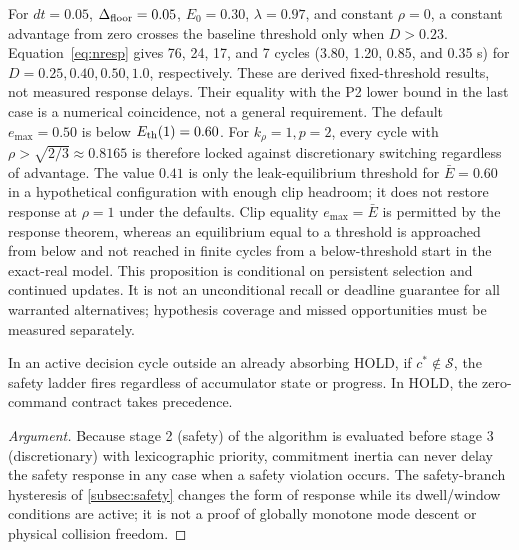 \begin{remark} \label{rem:resptime}
For $dt=0.05$, $\Delta_{\text{floor}}=0.05$, $E_0=0.30$, $\lambda=0.97$, and constant $\rho=0$, a constant advantage from zero crosses the baseline threshold only when $D>0.23$. Equation~\eqref{eq:nresp} gives 76, 24, 17, and 7 cycles (3.80, 1.20, 0.85, and 0.35 s) for $D=0.25,0.40,0.50,1.0$, respectively. These are derived fixed-threshold results, not measured response delays. Their equality with the P2 lower bound in the last case is a numerical coincidence, not a general requirement.
The default $e_{\max}=0.50$ is below $E_{\text{th}}(1)=0.60$. For $k_\rho=1,p=2$, every cycle with $\rho>\sqrt{2/3}\approx0.8165$ is therefore locked against discretionary switching regardless of advantage. The value $0.41$ is only the leak-equilibrium threshold for $\bar E=0.60$ in a hypothetical configuration with enough clip headroom; it does not restore response at $\rho=1$ under the defaults. Clip equality $e_{\max}=\bar E$ is permitted by the response theorem, whereas an equilibrium equal to a threshold is approached from below and not reached in finite cycles from a below-threshold start in the exact-real model.
This proposition is conditional on persistent selection and continued updates. It is not an unconditional recall or deadline guarantee for all warranted alternatives; hypothesis coverage and missed opportunities must be measured separately.
\end{remark}

\begin{proposition} \label{prop:p3}
In an active decision cycle outside an already absorbing HOLD, if $c^*\notin\mathcal{S}$, the safety ladder fires regardless of accumulator state or progress. In HOLD, the zero-command contract takes precedence.
\end{proposition}

\begin{proof}[Argument]
Because stage 2 (safety) of the algorithm is evaluated before stage 3 (discretionary) with lexicographic priority, commitment inertia can never delay the safety response in any case when a safety violation occurs. The safety-branch hysteresis of \cref{subsec:safety} changes the form of response while its dwell/window conditions are active; it is not a proof of globally monotone mode descent or physical collision freedom.
\end{proof}

